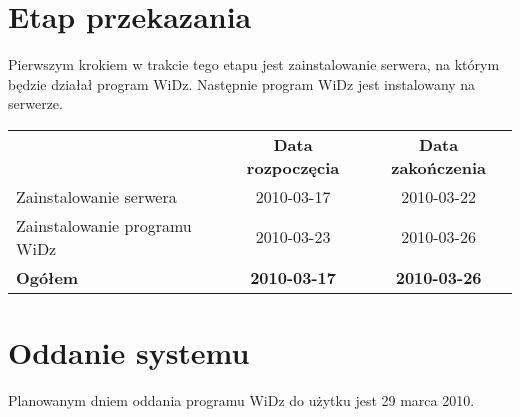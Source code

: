 \documentclass[12pt,leqno,twoside]{mwart}
\begin{document}
\section{Etap przekazania}
\noindent Pierwszym krokiem w trakcie tego etapu jest zainstalowanie serwera, na którym będzie działał program WiDz. Następnie program WiDz jest instalowany na serwerze.\\

		\begin{tabular}{m{8cm} c c}
		
		& \textbf{Data rozpoczęcia} & \textbf{Data zakończenia} \\ 
		Zainstalowanie serwera & 2010-03-17 & 2010-03-22 \\ 
		Zainstalowanie programu WiDz & 2010-03-23 & 2010-03-26 \\ 
		
		\textbf{Ogółem} & \textbf{2010-03-17} & \textbf{2010-03-26} \\ 
		\end{tabular}

\section{Oddanie systemu}
\noindent Planowanym dniem oddania programu WiDz do użytku jest 29 marca 2010.\\
\end{document}
